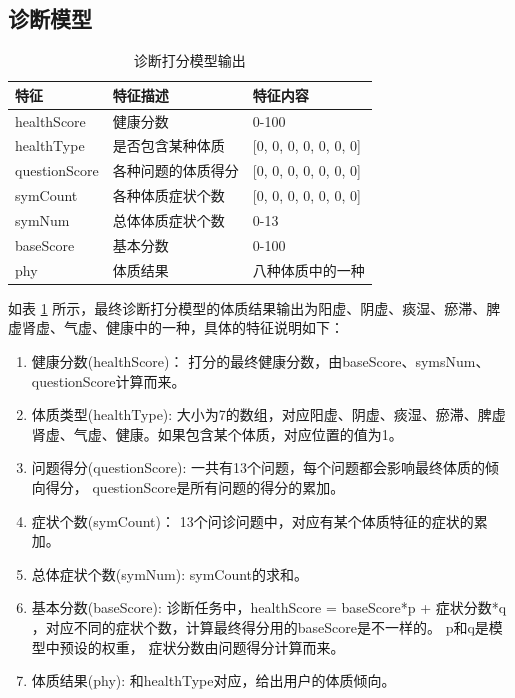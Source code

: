 \subsection{诊断模型}

\begin{table}[h]
    \begin{center}
        \begin{tabular}{lll}
            \toprule
            特征 & 特征描述 & 特征内容 \\ 
            \midrule
            healthScore & 健康分数 & 0-100 \\
            healthType & 是否包含某种体质 & {[}0, 0, 0, 0, 0, 0, 0{]} \\ 
            questionScore & 各种问题的体质得分 & {[}0, 0, 0, 0, 0, 0, 0{]} \\
            symCount & 各种体质症状个数 & {[}0, 0, 0, 0, 0, 0, 0{]} \\
            symNum & 总体体质症状个数 & 0-13 \\
            baseScore & 基本分数 & 0-100 \\
            phy & 体质结果 & 八种体质中的一种\\
            \bottomrule
        \end{tabular}
    \end{center}
    \caption{诊断打分模型输出}
    \label{tab:diag-feature}
\end{table}


如表 \ref{tab:diag-feature} 所示，最终诊断打分模型的体质结果输出为阳虚、阴虚、痰湿、瘀滞、脾虚肾虚、气虚、健康中的一种，具体的特征说明如下：
\begin{enumerate}
    \item 健康分数(healthScore)： 打分的最终健康分数，由baseScore、symsNum、questionScore计算而来。

    \item 体质类型(healthType): 大小为7的数组，对应阳虚、阴虚、痰湿、瘀滞、脾虚肾虚、气虚、健康。如果包含某个体质，对应位置的值为1。

    \item 问题得分(questionScore): 一共有13个问题，每个问题都会影响最终体质的倾向得分， questionScore是所有问题的得分的累加。

    \item 症状个数(symCount)： 13个问诊问题中，对应有某个体质特征的症状的累加。

    \item 总体症状个数(symNum): symCount的求和。

    \item 基本分数(baseScore): 诊断任务中，healthScore = baseScore*p + 症状分数*q ，对应不同的症状个数，计算最终得分用的baseScore是不一样的。 
p和q是模型中预设的权重， 症状分数由问题得分计算而来。

    \item 体质结果(phy): 和healthType对应，给出用户的体质倾向。
\end{enumerate}

